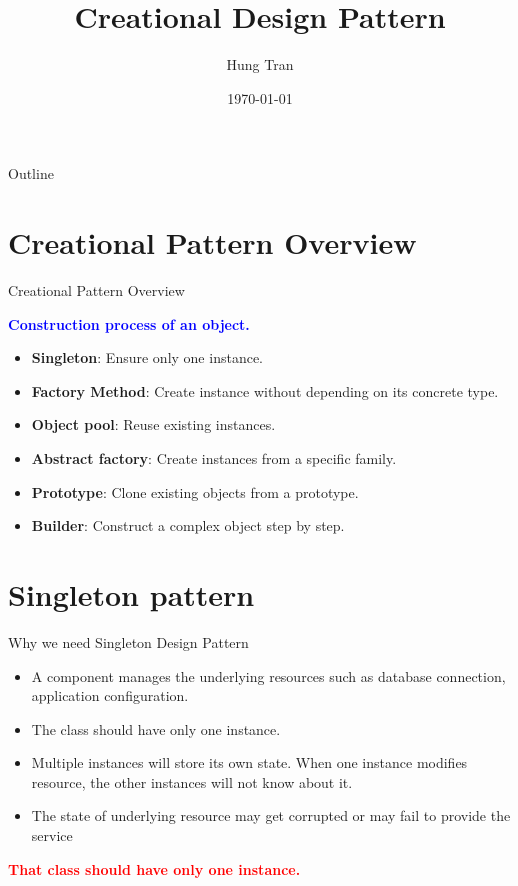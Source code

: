 \documentclass[13pt]{beamer}
\title[Design Pattern]{Creational Design Pattern}
\author{Hung Tran}
\institute{Fpt software}
\date{\today}
\begin{document}
\begin{frame}
  \titlepage
\end{frame}

\begin{frame}{Outline}
  \tableofcontents
\end{frame}

\section{Creational Pattern Overview}

\begin{frame}{Creational Pattern Overview}
	\begin{center}
	\textcolor{blue}{\textbf{Construction process of an object.}}
	\end{center}
	\begin{itemize}
		\setlength\itemsep{1em}
		\item \textbf{Singleton}: Ensure only one instance.
		\item \textbf{Factory Method}: Create instance without depending on its concrete type.
		\item \textbf{Object pool}: Reuse existing instances.
		\item \textbf{Abstract factory}: Create instances from a specific family.
		\item \textbf{Prototype}: Clone existing objects from a prototype.
		\item \textbf{Builder}: Construct a complex object step by step.
	\end{itemize}
\end{frame}

\section{Singleton pattern}

\begin{frame}{Why we need Singleton Design Pattern}
	\begin{itemize}
		\setlength\itemsep{1em}
		\item A component manages the underlying resources such as database connection, 					application configuration.
		\item The class should have only one instance.
		\item Multiple instances will store its own state. When one instance modifies resource, 			the other instances will not know about it. 
		\item The state of underlying resource may get corrupted or may fail to provide the 				service
	\end{itemize}
	\begin{center}
	\textcolor{red}{\textbf{That class should have only one instance.}}
	\end{center}
\end{frame}
\end{document}
